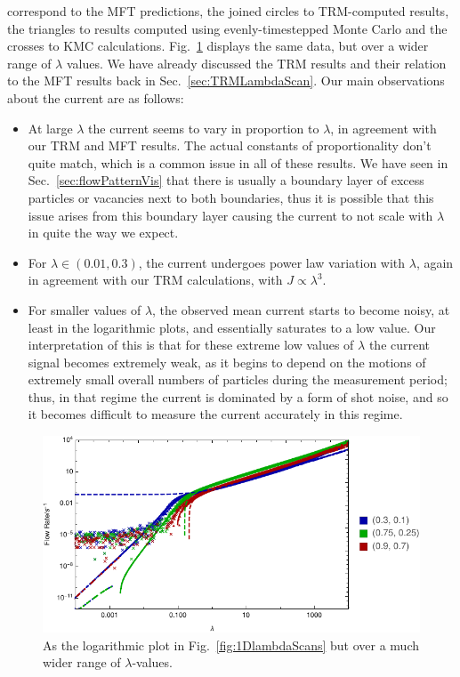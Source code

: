 correspond to the MFT predictions, the joined circles to TRM-computed results, the triangles to results
computed using evenly-timestepped Monte Carlo and the crosses to KMC calculations.
Fig.~\ref{fig:1DlambdaScansLogged} displays the same data, but over a wider range of $\lambda$ values.
We have already discussed the TRM results and their relation to the MFT results back in 
Sec.~\ref{sec:TRMLambdaScan}. Our main observations about the current are as follows:
\begin{itemize}
 \item At large $\lambda$ the current seems to vary in proportion to $\lambda$, in agreement with our
 TRM and MFT results. The actual constants of proportionality don't quite match, which is a common issue
 in all of these results. We have seen in Sec.~\ref{sec:flowPatternVis} that there is usually a boundary
 layer of excess particles or vacancies next to both boundaries, thus it is possible that this issue
 arises from this boundary layer causing the current to not scale with $\lambda$ in quite the way we
 expect.
 \item For $\lambda \in (0.01, 0.3)$, the current undergoes power law variation with $\lambda$, again in 
 agreement with our TRM calculations, with $J \propto \lambda^{3}$.
 \item For smaller values of $\lambda$, the observed mean current starts to become noisy, at least in the
 logarithmic plots, and essentially saturates to a low value. Our interpretation of this is that for these
 extreme low values of $\lambda$ the current signal becomes extremely weak, as it begins to depend on the
 motions of extremely small overall numbers of particles during the measurement period; thus, in that 
 regime the current is dominated by a form of shot noise, and so it becomes difficult to measure the current accurately in this regime.
\end{itemize}

\begin{figure} \caption[As Fig.~\ref{fig:1DlambdaScans} but over a much wider range of $\lambda$-values.]{As the logarithmic plot in Fig.~\ref{fig:1DlambdaScans} but over a  much wider range of $\lambda$-values.} 
\label{fig:1DlambdaScansLogged}
\begin{center}
\includegraphics[width=1.0\textheight, angle=270]{numerics/images/lambdaScan/allDataWide}
\end{center}
\end{figure}


